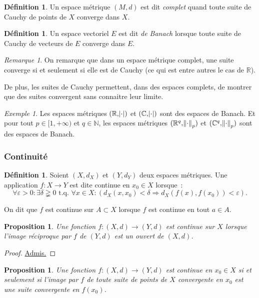 \documentclass{report}
\newtheorem{prp}[thm]{Proposition}
\theoremstyle{definition}
\newtheorem{déf}[thm]{Définition}
\theoremstyle{remark}
\newtheorem*{rmq}{Remarque}
\newtheorem{ex}{Exemple}[chapter]
\newcommand{\C}{\mathbb C}
\newcommand{\R}{\mathbb R}
\newcommand{\N}{\mathbb N}
\newcommand{\tq}{\text{ t.q. }}
\newcommand{\pinfty}{{+\infty}}
\newcommand{\grantedproof}{\begin{proof} \underline{Admis.} \end{proof}}
\begin{document}
				\begin{déf} Un espace métrique $(M, d)$ est dit \textit{complet} quand toute suite de Cauchy de points de $X$ converge dans $X$. \end{déf}

				\begin{déf} Un espace vectoriel $E$ est dit \textit{de Banach} lorsque toute suite de Cauchy de vecteurs de $E$ converge dans $E$. \end{déf}

				\begin{rmq} On remarque que dans un espace métrique complet, une suite converge si et seulement si elle est de Cauchy
				(ce qui est entre autres le cas de $\R$).

				De plus, les suites de Cauchy permettent, dans des espaces complets, de montrer que des suites convergent sans connaitre leur limite. \end{rmq}

				\begin{ex} Les espaces métriques $(\R, \abs \cdot)$ et $(\C, \abs \cdot)$ sont des espaces de Banach. Et pour tout $p \in [1, \pinfty)$ et
				$q \in \N$, les espaces métriques $(\R^q, \norm \cdot_p)$ et $(\C^q, \norm \cdot_p)$ sont des espaces de Banach. \end{ex}

			\subsubsection{Continuité}
				\begin{déf} Soient $(X, d_X)$ et $(Y, d_Y)$ deux espaces métriques. Une application $f : X \to Y$ est dite continue en $x_0 \in X$ lorsque~:
				\[\forall \varepsilon > 0 : \exists \delta \gneqq 0 \tq \forall x \in X :
					\left(d_X(x, x_0) < \delta \Rightarrow d_X(f(x), f(x_0)) < \varepsilon\right).\]

				On dit que $f$ est continue sur $A \subset X$ lorsque $f$ est continue en tout $a \in A$.
				\end{déf}

				\begin{prp} Une fonction $f : (X, d) \to (Y, d)$ est continue sur $X$ lorsque l'image réciproque par $f$ de $(Y, d)$ est un ouvert de $(X, d)$.
				\end{prp}

				\grantedproof

				\begin{prp} Une fonction $f : (X, d) \to (Y, d)$ est continue en $x_0 \in X$ si et seulement si l'image par $f$ de toute suite de points de
				$X$ convergente en $x_0$ est une suite convergente en $f(x_0)$. \end{prp}
\end{document}
